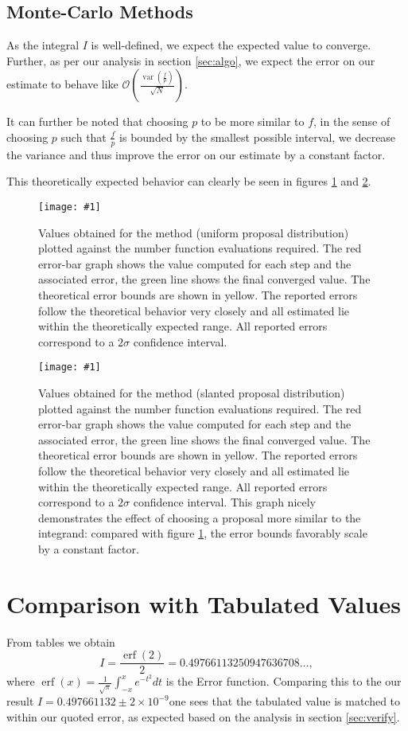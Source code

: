 \documentclass[10pt, a4paper]{article}
\newcommand{\plot}[3]{\begin{figure}[ht]\centering\texttt{[image: \#1]}\caption{#2}\label{#3}\end{figure}}
\newcommand{\final}{$I = 0.497661132 \pm 2\times10^{-9}$}
\begin{document}
  \subsection{Monte-Carlo Methods}
  As the integral $I$ is well-defined, we expect the expected value to converge. Further, as per our
  analysis in section \ref{sec:algo}, we expect the error on our estimate to behave like
  $\mathcal{O}\left( \frac{\operatorname{var}(\frac fp)}{\sqrt N} \right)$.

  It can further be noted that choosing $p$ to be more similar to $f$, in the sense of choosing $p$
  such that $\frac fp$ is bounded by the smallest possible interval, we decrease the variance and thus
  improve the error on our estimate by a constant factor.

  This theoretically expected behavior can clearly be seen in figures \ref{fig:mont-flat} and
  \ref{fig:mont-slant}.

  \plot{proj-mont-flat-accuracy}{
    Values obtained for the \is{} method (uniform proposal distribution) plotted against the number
    function evaluations required. The red
    error-bar graph shows the value computed for each step and the associated error, the green line
    shows the final converged value. The theoretical error bounds are shown in yellow. The reported errors
    follow the theoretical behavior very closely and all estimated lie within the theoretically expected range.
    All reported errors correspond to a $2\sigma$ confidence interval.
  }{fig:mont-flat}

  \plot{proj-mont-slanted-accuracy}{
    Values obtained for the \is{} method (slanted proposal distribution) plotted against the number
    function evaluations required. The red
    error-bar graph shows the value computed for each step and the associated error, the green line
    shows the final converged value. The theoretical error bounds are shown in yellow. The reported errors
    follow the theoretical behavior very closely and all estimated lie within the theoretically expected range.
    All reported errors correspond to a $2\sigma$ confidence interval. This graph nicely demonstrates the
    effect of choosing a proposal more similar to the integrand: compared with figure \ref{fig:mont-flat},
    the error bounds favorably scale by a constant factor.
  }{fig:mont-slant}

{}


\appendix{}

\section{Comparison with Tabulated Values}
\label{app:cheat}
From tables we obtain
\begin{equation}
I = \frac{\operatorname{erf}(2)}{2} = 0.49766113250947636708 \dots,
\end{equation}
where $\operatorname{erf}(x) = \frac{1}{\sqrt\pi}\int_{-x}^x e^{-t^2} dt$ is the Error function. Comparing
this to the our result \final one sees that the tabulated value is matched to within our
quoted error, as expected based on the analysis in section \ref{sec:verify}.
\end{document}
